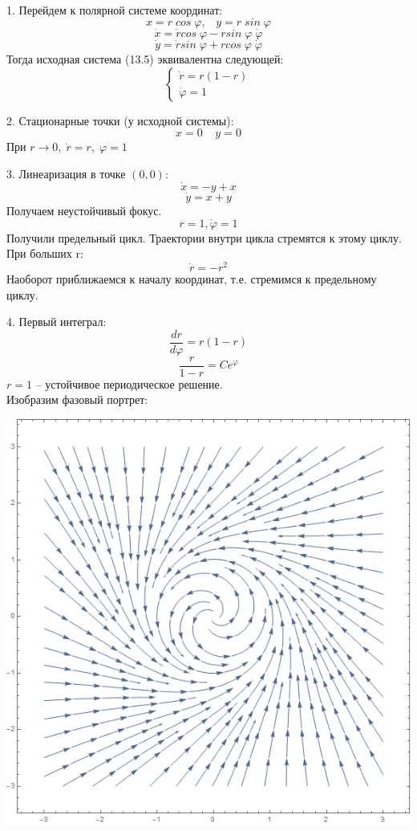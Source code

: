 \documentclass[10pt]{report}
\begin{document}
1. Перейдем к полярной системе координат:
\[x=r\;cos\;\varphi,\;\;\;y=r\;sin\;\varphi\]
\[\dot{x}=\dot{r}cos\;\varphi-rsin\;\varphi\;\dot{\varphi}\]
\[\dot{y}=\dot{r}sin\;\varphi+rcos\;\varphi\;\dot{\varphi}\]
Тогда исходная система (13.5) эквивалентна следующей:
\[\left\{
\begin{array}{lr}
\dot{r}=r(1-r)\\
\dot{\varphi}=1
\end{array}
\right.\]

2. Стационарные точки (у исходной системы):
\[x=0\;\;\;\; y=0\]
При $r\rightarrow 0,\; \dot{r}=r,\; \varphi=1$

3. Линеаризация в точке $(0,0)$:
\[\dot{x}=-y+x\]
\[\dot{y}=x+y\]
Получаем неустойчивый фокус.
\[ r= 1, \dot{\varphi}=1\]
Получили предельный цикл. Траектории внутри цикла стремятся к этому циклу. При больших r:
\[\dot{r}=-r^2\]
Наоборот приближаемся к началу координат, т.е. стремимся к предельному циклу.

4. Первый интеграл:
\[ \frac {dr}{d\varphi}=r(1-r)\]
\[\frac {r} {1-r}=Ce^{\varphi}\]
$r=1$ -- устойчивое периодическое решение.\\
Изобразим фазовый портрет:
\begin{center} 
{\includegraphics[scale=0.6]{graph13.6.png}} 
\end{center}
\end{document}
